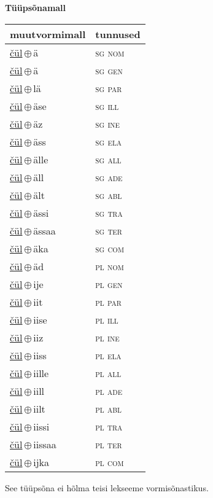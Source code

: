 

\vspace{3.5em}
\noindent \begin{minipage}{\textwidth}
\noindent \textbf{Tüüpsõnamall \,}\\

\begin{sideways}
\begin{tabular}{l l}
muutvormimall & tunnused \\
\hline
\underline{čül}\,$\oplus$\,ä & \textsc{ sg nom } \\
\underline{čül}\,$\oplus$\,ä & \textsc{ sg gen } \\
\underline{čül}\,$\oplus$\,lä & \textsc{ sg par } \\
\underline{čül}\,$\oplus$\,äse & \textsc{ sg ill } \\
\underline{čül}\,$\oplus$\,äz & \textsc{ sg ine } \\
\underline{čül}\,$\oplus$\,äss & \textsc{ sg ela } \\
\underline{čül}\,$\oplus$\,älle & \textsc{ sg all } \\
\underline{čül}\,$\oplus$\,äll & \textsc{ sg ade } \\
\underline{čül}\,$\oplus$\,ält & \textsc{ sg abl } \\
\underline{čül}\,$\oplus$\,ässi & \textsc{ sg tra } \\
\underline{čül}\,$\oplus$\,ässaa & \textsc{ sg ter } \\
\underline{čül}\,$\oplus$\,äka & \textsc{ sg com } \\
\underline{čül}\,$\oplus$\,äd & \textsc{ pl nom } \\
\underline{čül}\,$\oplus$\,ije & \textsc{ pl gen } \\
\underline{čül}\,$\oplus$\,iit & \textsc{ pl par } \\
\underline{čül}\,$\oplus$\,iise & \textsc{ pl ill } \\
\underline{čül}\,$\oplus$\,iiz & \textsc{ pl ine } \\
\underline{čül}\,$\oplus$\,iiss & \textsc{ pl ela } \\
\underline{čül}\,$\oplus$\,iille & \textsc{ pl all } \\
\underline{čül}\,$\oplus$\,iill & \textsc{ pl ade } \\
\underline{čül}\,$\oplus$\,iilt & \textsc{ pl abl } \\
\underline{čül}\,$\oplus$\,iissi & \textsc{ pl tra } \\
\underline{čül}\,$\oplus$\,iissaa & \textsc{ pl ter } \\
\underline{čül}\,$\oplus$\,ijka & \textsc{ pl com } \\
\end{tabular}
\end{sideways}
\label{tab:tüüpsõnamall-čülä}

\end{minipage}

 
\vspace{1em}
\noindent See tüüpsõna ei hõlma teisi lekseeme vormi\-sõnastikus.
